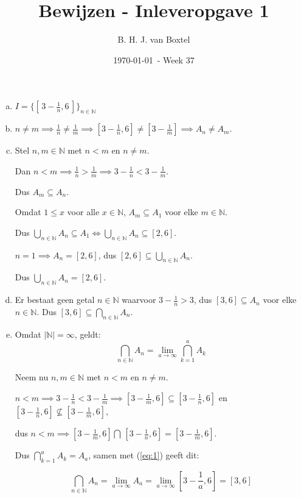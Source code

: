 \documentclass[12pt, a4paper]{article}
\begin{document}
\title{Bewijzen - Inleveropgave 1}
\author{B. H. J. van Boxtel}
\date{\today \, - Week 37} 

\maketitle
{} %

\begin{enumerate}[(a)] 
    \item $I = \{[\, 3 - \frac{1}{n}, 6 \,]\}_{n \in \mathbb{N}}$
    \bigskip
    \item $n \neq m \implies \frac{1}{n} \neq \frac{1}{m} \implies [3 -\frac{1}{n}, 6] \neq [3 - \frac{1}{m}] \implies A_n \neq A_m$.
    \bigskip
    \item Stel $n,m \in \mathbb{N}$ met $n < m$ en $n \neq m$.
    
    Dan $n < m \implies \frac{1}{n} > \frac{1}{m} \implies 3 - \frac{1}{n} < 3 - \frac{1}{m}$.

    Dus $A_m \subseteq A_n$.

    Omdat $1 \leq x$ voor alle $x \in \mathbb{N}$, $ A_m \subseteq A_1$ voor elke $m \in \mathbb{N}$.

    Dus $\bigcup_{n \in \mathbb{N}} A_n \subseteq A_1 \iff \bigcup_{n \in \mathbb{N}} A_n \subseteq [2,6]$.
    \bigskip

    $n = 1 \implies A_n = [2,6]$, dus $[2,6] \subseteq \bigcup_{n \in \mathbb{N}} A_n$.

    Dus $\bigcup_{n \in \mathbb{N}} A_n = [2,6]$.
    \bigskip

    \item Er bestaat geen getal $n \in \mathbb{N}$ waarvoor $3 - \frac{1}{n} > 3$, dus $[3,6] \subseteq A_n$ voor elke $n \in \mathbb{N}$. Dus $[3,6] \subseteq \bigcap_{n \in \mathbb{N}} A_n$.
    \bigskip

    \item Omdat $\lvert \mathbb{N} \rvert = \infty$, geldt:
    \begin{equation} \label{eq:1}
        \bigcap_{n \in \mathbb{N}} A_n = \lim_{a\to\infty}\bigcap_{k = 1}^{a} A_k
    \end{equation}

    Neem nu $n,m \in \mathbb{N}$ met $n < m$ en $n \neq m$.

    $n < m \implies 3 - \frac{1}{n} < 3 - \frac{1}{m} \implies [3 - \frac{1}{m}, 6] \subseteq [3 - \frac{1}{n}, 6]$ en $[3 - \frac{1}{n}, 6] \nsubseteq [3 - \frac{1}{m}, 6]$, 
    
    dus $n < m \implies [3 - \frac{1}{m}, 6] \bigcap \, [3 - \frac{1}{n}, 6] = [3 - \frac{1}{m}, 6]$.

    Dus $\bigcap_{k = 1}^{a} A_k = A_a$, samen met (\ref{eq:1}) geeft dit:

    \begin{equation}
        \bigcap_{n \in \mathbb{N}} A_n = \lim_{a\to\infty}A_a = \lim_{a\to\infty} [3 - \frac{1}{a}, 6] = [3 , 6]
    \end{equation}

\end{enumerate}
\end{document}

